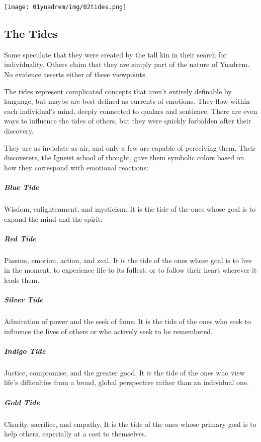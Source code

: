 

\begin{center}
    \texttt{[image: 01yuadrem/img/02tides.png]}
\end{center}

\subsection*{The Tides} \label{ssec::tides}
Some speculate that they were created by the tall kin in their search for individuality.
Others claim that they are simply part of the nature of Yuadrem.
No evidence asserts either of these viewpoints.

The tides represent complicated concepts that aren't entirely definable by language, but maybe are best defined as currents of emotions.
They flow within each individual's mind, deeply connected to qualars and sentience.
There are even ways to influence the tides of others, but they were quickly forbidden after their discovery.

They are as inviolate as air, and only a few are capable of perceiving them.
Their discoverers, the Igneist school of thought, gave them symbolic colors based on how they correspond with emotional reactions:

\subparagraph{Blue Tide} Wisdom, enlightenment, and mysticism.
It is the tide of the ones whose goal is to expand the mind and the spirit.

\subparagraph{Red Tide} Passion, emotion, action, and zeal.
It is the tide of the ones whose goal is to live in the moment, to experience life to its fullest, or to follow their heart wherever it leads them.

\subparagraph{Silver Tide} Admiration of power and the seek of fame.
It is the tide of the ones who seek to influence the lives of others or who actively seek to be remembered.

\subparagraph{Indigo Tide} Justice, compromise, and the greater good.
It is the tide of the ones who view life's difficulties from a broad, global perspective rather than an individual one.

\subparagraph{Gold Tide} Charity, sacrifice, and empathy.
It is the tide of the ones whose primary goal is to help others, especially at a cost to themselves.

